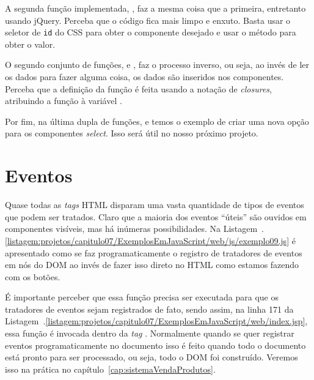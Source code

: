 A segunda função implementada, , faz a mesma coisa que a primeira, entretanto usando jQuery. Perceba que o código fica mais limpo e enxuto. Basta usar o seletor de \texttt{id} do CSS para obter o componente desejado e usar o método  para obter o valor.

O segundo conjunto de funções,  e \newline%
, faz o processo inverso, ou seja, ao invés de ler os dados para fazer alguma coisa, os dados são inseridos nos componentes. Perceba que a definição da função  é feita usando a notação de \textit{closures}, atribuindo a função à variável .

Por fim, na última dupla de funções,  e \newline%
 temos o exemplo de criar uma nova opção para os componentes \textit{select}. Isso será útil no nosso próximo projeto.



\section{Eventos}

Quase todas as \textit{tags} HTML disparam uma vasta quantidade de tipos de eventos que podem ser tratados. Claro que a maioria dos eventos ``úteis'' são ouvidos em componentes visíveis, mas há inúmeras possibilidades. Na Listagem~\thechapter.\ref{listagem:projetos/capitulo07/ExemplosEmJavaScript/web/js/exemplo09.js} é apresentado como se faz programaticamente o registro de tratadores de eventos em nós do DOM ao invés de fazer isso direto no HTML como estamos fazendo com os botões.


É importante perceber que essa função precisa ser executada para que os tratadores de eventos sejam registrados de fato, sendo assim, na linha 171 da Listagem~\thechapter.\ref{listagem:projetos/capitulo07/ExemplosEmJavaScript/web/index.jsp}, essa função é invocada dentro da \textit{tag} . Normalmente quando se quer registrar eventos programaticamente no documento isso é feito quando todo o documento está pronto para ser processado, ou seja, todo o DOM foi construído. Veremos isso na prática no capítulo~\ref{cap:sistemaVendaProdutos}.

